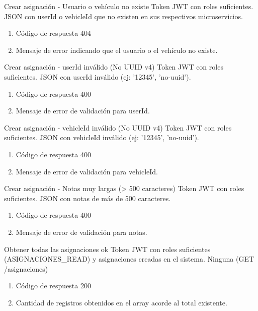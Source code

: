 {Crear asignación - Usuario o vehículo no existe}
{Token JWT con roles suficientes.}
{JSON con userId o vehicleId que no existen en sus respectivos microservicios.}
{\begin{enumerate} [leftmargin=*, nosep]
    \item Código de respuesta 404
    \item Mensaje de error indicando que el usuario o el vehículo no existe.
\end{enumerate}}

{Crear asignación - userId inválido (No UUID v4)}
{Token JWT con roles suficientes.}
{JSON con userId inválido (ej: '12345', 'no-uuid').}
{\begin{enumerate} [leftmargin=*, nosep]
    \item Código de respuesta 400
    \item Mensaje de error de validación para userId.
\end{enumerate}}

{Crear asignación - vehicleId inválido (No UUID v4)}
{Token JWT con roles suficientes.}
{JSON con vehicleId inválido (ej: '12345', 'no-uuid').}
{\begin{enumerate} [leftmargin=*, nosep]
    \item Código de respuesta 400
    \item Mensaje de error de validación para vehicleId.
\end{enumerate}}

{Crear asignación - Notas muy largas (> 500 caracteres)}
{Token JWT con roles suficientes.}
{JSON con notas de más de 500 caracteres.}
{\begin{enumerate} [leftmargin=*, nosep]
    \item Código de respuesta 400
    \item Mensaje de error de validación para notas.
\end{enumerate}}

{Obtener todas las asignaciones ok}
{Token JWT con roles suficientes (ASIGNACIONES\_READ) y asignaciones creadas en el sistema.}
{Ninguna (GET /asignaciones)}
{\begin{enumerate} [leftmargin=*, nosep]
    \item Código de respuesta 200
    \item Cantidad de registros obtenidos en el array acorde al total existente.
\end{enumerate}}

